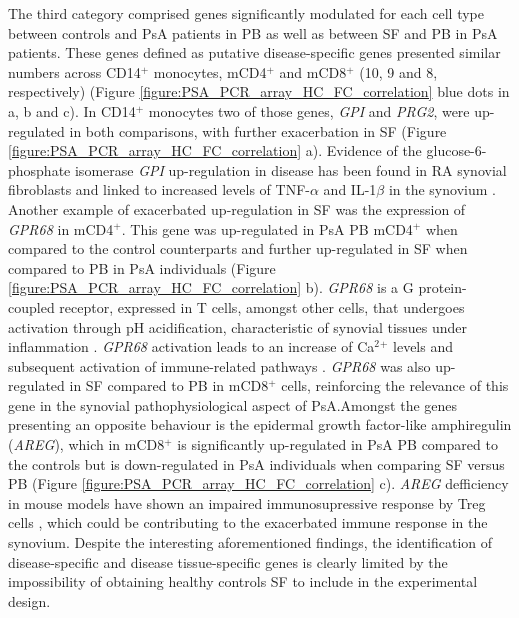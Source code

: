 The third category comprised genes significantly modulated for each cell type between controls and PsA patients in PB as well as between SF and PB in PsA patients. These genes defined as putative disease-specific genes presented similar numbers across CD14$^+$ monocytes, mCD4$^+$ and mCD8$^+$ (10, 9 and 8, respectively) (Figure \ref{figure:PSA_PCR_array_HC_FC_correlation} blue dots in a, b and c). In CD14$^+$ monocytes two of those genes, \textit{GPI} and \textit{PRG2}, were up-regulated in both comparisons, with further exacerbation in SF (Figure \ref{figure:PSA_PCR_array_HC_FC_correlation} a). Evidence of the glucose-6-phosphate isomerase \textit{GPI} up-regulation in disease has been found in RA synovial fibroblasts and linked to increased levels of TNF-$\alpha$ and IL-1$\beta$ in the synovium \parencite{Zhong2015}. %
Another example of exacerbated up-regulation in SF was the expression of \textit{GPR68} in mCD4$^+$. This gene was up-regulated in PsA PB mCD4$^+$ when compared to the control counterparts and further up-regulated in SF when compared to PB in PsA individuals (Figure \ref{figure:PSA_PCR_array_HC_FC_correlation} b). \textit{GPR68} is a G protein-coupled receptor, expressed in T cells, amongst other cells, that undergoes activation through pH acidification, characteristic of synovial tissues under inflammation \parencite{Biniecka2016}. \textit{GPR68} activation leads to an increase of Ca$^2$$^+$ levels and subsequent activation of immune-related pathways \parencite{Saxena2011}. \textit{GPR68} was also up-regulated in SF compared to PB in mCD8$^+$ cells, reinforcing the relevance of this gene in the synovial pathophysiological aspect of PsA.Amongst the genes presenting an opposite behaviour is the epidermal growth factor-like amphiregulin (\textit{AREG}), which in mCD8$^+$ is significantly up-regulated in PsA PB compared to the controls but is down-regulated in PsA individuals when comparing SF versus PB (Figure \ref{figure:PSA_PCR_array_HC_FC_correlation} c). \textit{AREG} defficiency in mouse models have shown an impaired immunosupressive response by Treg cells \parencite{Zaiss2013}, which could be contributing to the exacerbated immune response in the synovium. 
Despite the interesting aforementioned findings, the identification of disease-specific and disease tissue-specific genes is clearly limited by the impossibility of obtaining healthy controls SF to include in the experimental design.

